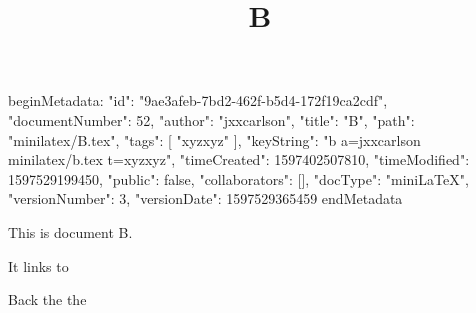 beginMetadata:
{
    "id": "9ae3afeb-7bd2-462f-b5d4-172f19ca2cdf",
    "documentNumber": 52,
    "author": "jxxcarlson",
    "title": "B",
    "path": "minilatex/B.tex",
    "tags": [
        "xyzxyz"
    ],
    "keyString": "b a=jxxcarlson minilatex/b.tex t=xyzxyz",
    "timeCreated": 1597402507810,
    "timeModified": 1597529199450,
    "public": false,
    "collaborators": [],
    "docType": "miniLaTeX",
    "versionNumber": 3,
    "versionDate": 1597529365459
}
endMetadata
\title{B}

\maketitle

This is document B.

It links to 


Back the the 
